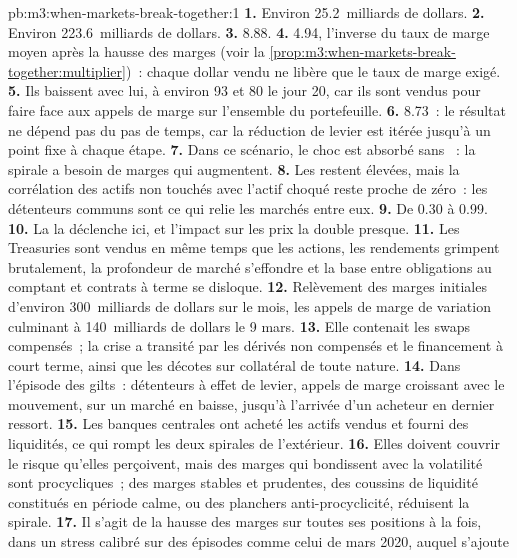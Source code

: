 \begin{solution}{pb:m3:when-markets-break-together:1}
\textbf{1.} Environ 25.2~milliards de dollars. \textbf{2.} Environ 223.6~milliards de dollars. \textbf{3.} 8.88. \textbf{4.} 4.94, l'inverse du taux de marge moyen
après la hausse des marges (voir la \cref{prop:m3:when-markets-break-together:multiplier})~: chaque dollar vendu ne libère que le taux de marge exigé. \textbf{5.} Ils
baissent avec lui, à environ 93 et 80 le jour 20, car ils sont vendus pour faire face aux appels de marge sur l'ensemble du portefeuille. \textbf{6.} 8.73~: le résultat ne dépend
pas du pas de temps, car la réduction de levier est itérée jusqu'à un point fixe à chaque étape. \textbf{7.} Dans ce scénario, le choc est absorbé sans ~: la spirale
a besoin de marges qui augmentent. \textbf{8.} Les  restent élevées, mais la corrélation des actifs non touchés avec l'actif choqué reste proche de zéro~: les détenteurs communs
sont ce qui relie les marchés entre eux. \textbf{9.} De 0.30 à 0.99. \textbf{10.} La  la déclenche ici, et l'impact sur les prix la double presque. \textbf{11.}
Les Treasuries sont vendus en même temps que les actions, les rendements grimpent brutalement, la profondeur de marché s'effondre et la base entre obligations au comptant et contrats à terme se disloque. \textbf{12.} Relèvement
des marges initiales d'environ 300~milliards de dollars sur le mois, les appels de marge de variation culminant à 140~milliards de dollars le 9 mars. \textbf{13.} Elle
contenait les swaps compensés~; la crise a transité par les dérivés non compensés et le financement à court terme, ainsi que les décotes sur collatéral de toute nature. \textbf{14.} Dans l'épisode
des gilts~: détenteurs à effet de levier, appels de marge croissant avec le mouvement,  sur un marché en baisse, jusqu'à l'arrivée d'un acheteur en dernier ressort.
\textbf{15.} Les banques centrales ont acheté les actifs vendus et fourni des liquidités, ce qui rompt les deux spirales de l'extérieur. \textbf{16.} Elles doivent couvrir le risque
qu'elles perçoivent, mais des marges qui bondissent avec la volatilité sont procycliques~; des marges stables et prudentes, des coussins de liquidité constitués en période calme, ou des planchers
anti-procyclicité, réduisent la spirale. \textbf{17.} Il s'agit de la hausse des marges sur toutes ses positions à la fois, dans un stress calibré sur des épisodes comme celui de mars 2020, auquel s'ajoute

\end{solution}
